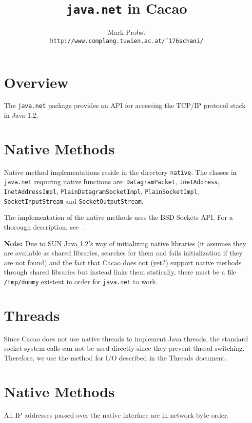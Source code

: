 \documentclass[twocolumn,a4paper]{article}      %
\author{
	Mark Probst\\
	{\tt http://www.complang.tuwien.ac.at/\char'176schani/}
	}
\title{\texttt{java.net} in Cacao}
\begin{document}
\maketitle

\section{Overview}

The \texttt{java.net} package provides an API for accessing the TCP/IP
protocol stack in Java 1.2.

\section{Native Methods}

Native method implementations reside in the directory
\texttt{native}. The classes in \texttt{java.net} requiring native
functions are: \texttt{DatagramPacket}, \texttt{InetAddress},
\texttt{InetAddressImpl}, \texttt{PlainDatagramSocketImpl},
\texttt{PlainSocketImpl}, \texttt{SocketInputStream} and
\texttt{SocketOutputStream}.

The implementation of the native methods uses the BSD Sockets API. For
a thorough description, see~\cite{stevens1}. 

\textbf{Note:} Due to SUN Java 1.2's way of initializing native
libraries (it assumes they are available as shared libraries, searches
for them and fails initialization if they are not found) and the fact
that Cacao does not (yet?) support native methods through shared
libraries but instead links them statically, there must be a file
\texttt{/tmp/dummy} existent in order for \texttt{java.net} to work.

\section{Threads}

Since Cacao does not use native threads to implement Java threads, the
standard socket system calls can not be used directly since they
prevent thread switching. Therefore, we use the method for I/O
described in the Threads document.

\section{Native Methods}

All IP addresses passed over the native interface are in network byte
order.
\end{document}
